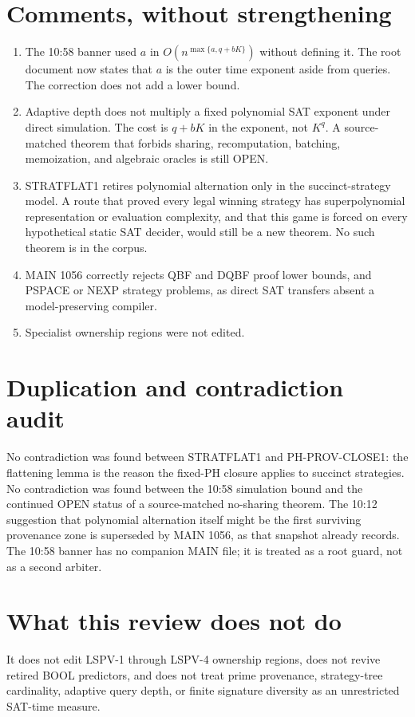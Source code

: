 \documentclass[11pt]{article}
\begin{document}
\section*{Comments, without strengthening}
\begin{enumerate}
\item The 10:58 banner used \(a\) in \(O(n^{\max\{a,q+bK\}})\) without defining it.
The root document now states that \(a\) is the outer time exponent aside from queries.
The correction does not add a lower bound.
\item Adaptive depth does not multiply a fixed polynomial SAT exponent under direct
simulation. The cost is \(q+bK\) in the exponent, not \(K^q\). A source-matched theorem
that forbids sharing, recomputation, batching, memoization, and algebraic oracles is
still OPEN.
\item STRATFLAT1 retires polynomial alternation only in the succinct-strategy model.
A route that proved every legal winning strategy has superpolynomial representation or
evaluation complexity, and that this game is forced on every hypothetical static SAT
decider, would still be a new theorem. No such theorem is in the corpus.
\item MAIN 1056 correctly rejects QBF and DQBF proof lower bounds, and PSPACE or NEXP
strategy problems, as direct SAT transfers absent a model-preserving compiler.
\item Specialist ownership regions were not edited.
\end{enumerate}

\section*{Duplication and contradiction audit}
No contradiction was found between STRATFLAT1 and PH-PROV-CLOSE1: the flattening lemma
is the reason the fixed-PH closure applies to succinct strategies. No contradiction was
found between the 10:58 simulation bound and the continued OPEN status of a
source-matched no-sharing theorem. The 10:12 suggestion that polynomial alternation
itself might be the first surviving provenance zone is superseded by MAIN 1056, as that
snapshot already records. The 10:58 banner has no companion MAIN file; it is treated as
a root guard, not as a second arbiter.

\section*{What this review does not do}
It does not edit LSPV-1 through LSPV-4 ownership regions, does not revive retired BOOL
predictors, and does not treat prime provenance, strategy-tree cardinality, adaptive
query depth, or finite signature diversity as an unrestricted SAT-time measure.
\end{document}
